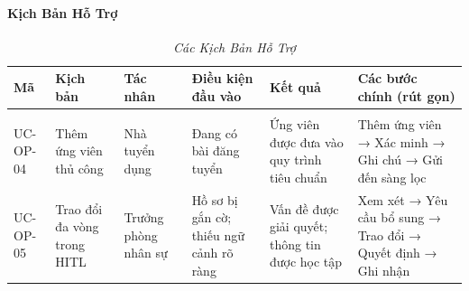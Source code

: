 \documentclass{article}
\begin{document}
\paragraph{Kịch Bản Hỗ Trợ}

\begin{longtable}{|
  >{\raggedright\arraybackslash}p{}|
  >{\raggedright\arraybackslash}p{}|
  >{\raggedright\arraybackslash}p{}|
  >{\raggedright\arraybackslash}p{}|
  >{\raggedright\arraybackslash}p{}|
  >{\raggedright\arraybackslash}p{}|}

  \hline
  \textbf{Mã} &
  \textbf{Kịch bản} &
  \textbf{Tác nhân} &
  \textbf{Điều kiện đầu vào} &
  \textbf{Kết quả} &
  \textbf{Các bước chính (rút gọn)} \\
  \hline
  \endfirsthead

  \endhead

  \hline
  \endfoot

  \hline
  \caption{\textit{Các Kịch Bản Hỗ Trợ}} \\
  \endlastfoot

  UC-OP-04 &
  Thêm ứng viên thủ công &
  Nhà tuyển dụng &
  Đang có bài đăng tuyển &
  Ứng viên được đưa vào quy trình tiêu chuẩn &
  Thêm ứng viên → Xác minh → Ghi chú → Gửi đến sàng lọc \\
  \hline

  UC-OP-05 &
  Trao đổi đa vòng trong HITL &
  Trưởng phòng nhân sự &
  Hồ sơ bị gắn cờ; thiếu ngữ cảnh rõ ràng &
  Vấn đề được giải quyết; thông tin được học tập &
  Xem xét → Yêu cầu bổ sung → Trao đổi → Quyết định → Ghi nhận \\
\end{longtable}
\end{document}

